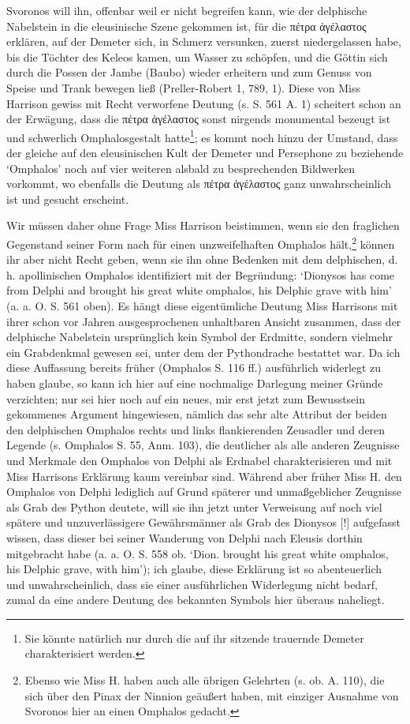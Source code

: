 \documentclass[a4paper, 11pt, oneside]{article}
\begin{document}
Svoronos will ihn, offenbar weil er nicht begreifen kann, wie der delphische Nabelstein in die eleusinische Szene gekommen ist, für die πέτρα ἀγέλαστος erklären, auf der Demeter sich, in Schmerz versunken, zuerst niedergelassen habe, bis die Töchter des Keleos kamen, um Wasser zu schöpfen, und die Göttin sich durch die Possen der Jambe (Baubo) wieder erheitern und zum Genuss von Speise und Trank bewegen ließ (Preller-Robert 1, 789, 1). Diese von Miss Harrison gewiss mit Recht verworfene Deutung (s. S. 561 A. 1) scheitert schon an der Erwägung, dass die πέτρα ἀγέλαστος sonst nirgends monumental bezeugt ist und schwerlich Omphalosgestalt hatte\footnote{Sie könnte natürlich nur durch die auf ihr sitzende trauernde Demeter charakterisiert werden.}; es kommt noch hinzu der Umstand, dass der gleiche auf den eleusinischen Kult der Demeter und Persephone zu beziehende `Omphalos' noch auf vier weiteren alsbald zu besprechenden Bildwerken vorkommt, wo ebenfalls die Deutung als πέτρα ἀγέλαστος ganz unwahrscheinlich ist und gesucht erscheint.

Wir müssen daher ohne Frage Miss Harrison beistimmen, wenn sie den fraglichen Gegenstand seiner Form nach für einen unzweifelhaften Omphalos hält,\footnote{Ebenso wie Miss H. haben auch alle übrigen Gelehrten (s. ob. A. 110), die sich über den Pinax der Ninnion geäußert haben, mit einziger Ausnahme von Svoronos hier an einen Omphalos gedacht.} können ihr aber nicht Recht geben, wenn sie ihn ohne Bedenken mit dem delphischen, d. h. apollinischen Omphalos identifiziert mit der Begründung: `Dionysos has come from Delphi and brought his great white omphalos, his Delphic grave with him' (a. a. O. S. 561 oben). Es hängt diese eigentümliche Deutung Miss Harrisons mit ihrer schon vor Jahren ausgesprochenen unhaltbaren Ansicht zusammen, dass der delphische Nabelstein ursprünglich kein Symbol der Erdmitte, sondern vielmehr ein Grabdenkmal gewesen sei, unter dem der Pythondrache bestattet war. Da ich diese Auffassung bereits früher (Omphalos S. 116 ff.) ausführlich widerlegt zu haben glaube, so kann ich hier auf eine nochmalige Darlegung meiner Gründe verzichten; nur sei hier noch auf ein neues, mir erst jetzt zum Bewusstsein gekommenes Argument hingewiesen, nämlich das sehr alte Attribut der beiden den delphischen Omphalos rechts und links flankierenden Zeusadler und deren Legende (s. Omphalos S. 55, Anm. 103), die deutlicher als alle anderen Zeugnisse und Merkmale den Omphalos von Delphi als Erdnabel charakterisieren und mit Miss Harrisons Erklärung kaum vereinbar sind. Während aber früher Miss H. den Omphalos von Delphi lediglich auf Grund späterer und unmaßgeblicher Zeugnisse als Grab des Python deutete, will sie ihn jetzt unter Verweisung auf noch viel spätere und unzuverlässigere Gewährsmänner als Grab des Dionysos [!] aufgefasst wissen, dass dieser bei seiner Wanderung von Delphi nach Eleusis dorthin mitgebracht habe (a. a. O. S. 558 ob. `Dion. brought his great white omphalos, his Delphic grave, with him'); ich glaube, diese Erklärung ist so abenteuerlich und unwahrscheinlich, dass sie einer ausführlichen Widerlegung nicht bedarf, zumal da eine andere Deutung des bekannten Symbols hier überaus naheliegt.
\end{document}
